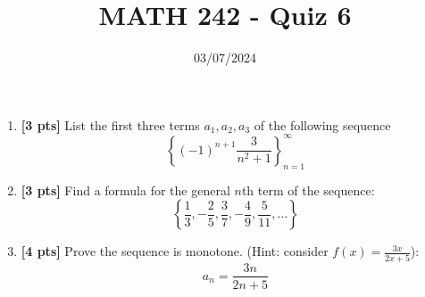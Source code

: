 \documentclass[12pt]{article}
\title{MATH 242 - Quiz 6}
\date{03/07/2024}
\begin{document}
\maketitle

\begin{enumerate}

\item \textbf{[3 pts]} List the first three terms $a_1,a_2,a_3$ of the following sequence $$\left\{(-1)^{n+1}\frac{3}{n^2+1}\right\}_{n=1}^{\infty}$$
\vfill
\item \textbf{[3 pts]} Find a formula for the general $n$th term of the sequence:
$$\left\{\frac{1}{3},-\frac{2}{5},\frac{3}{7},-\frac{4}{9},\frac{5}{11},\dots\right\}$$
\vfill
\newpage
\item \textbf{[4 pts]} Prove the sequence is monotone. (Hint: consider $f(x)=\frac{3x}{2x+5}$): $$a_n=\frac{3n}{2n+5}$$

\end{enumerate}
\end{document}
